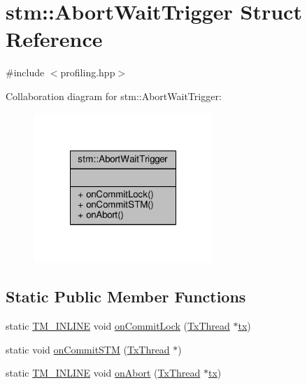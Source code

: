 \hypertarget{structstm_1_1AbortWaitTrigger}{\section{stm\-:\-:Abort\-Wait\-Trigger Struct Reference}
\label{structstm_1_1AbortWaitTrigger}
}


{\ttfamily \#include $<$profiling.\-hpp$>$}



Collaboration diagram for stm\-:\-:Abort\-Wait\-Trigger\-:
\nopagebreak
\begin{figure}[H]
\begin{center}
\leavevmode
\includegraphics[width=192pt]{structstm_1_1AbortWaitTrigger__coll__graph}
\end{center}
\end{figure}
\subsection*{Static Public Member Functions}
\begin{DoxyCompactItemize}
\item 
static \hyperlink{platform_8hpp_abdc8d70d196a73a2a119efdbe674ecf8}{T\-M\-\_\-\-I\-N\-L\-I\-N\-E} void \hyperlink{structstm_1_1AbortWaitTrigger_a569a71f4008818dba88b07dd6757e33f}{on\-Commit\-Lock} (\hyperlink{structstm_1_1TxThread}{Tx\-Thread} $\ast$\hyperlink{stmskip_8cc_a0f1c58699b83ce5a08bd9ee859250d72}{tx})
\item 
static void \hyperlink{structstm_1_1AbortWaitTrigger_a8c7937ac9aa45dd7a240e636b4bc0ed8}{on\-Commit\-S\-T\-M} (\hyperlink{structstm_1_1TxThread}{Tx\-Thread} $\ast$)
\item 
static \hyperlink{platform_8hpp_abdc8d70d196a73a2a119efdbe674ecf8}{T\-M\-\_\-\-I\-N\-L\-I\-N\-E} void \hyperlink{structstm_1_1AbortWaitTrigger_afb8db71071daad0585654b95ff8edd04}{on\-Abort} (\hyperlink{structstm_1_1TxThread}{Tx\-Thread} $\ast$\hyperlink{stmskip_8cc_a0f1c58699b83ce5a08bd9ee859250d72}{tx})
\end{DoxyCompactItemize}


